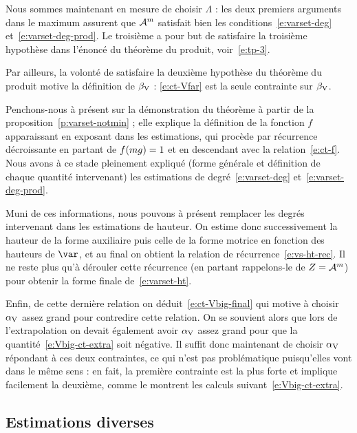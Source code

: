 Nous sommes maintenant en mesure de choisir \( \Lambda \) : les deux premiers
arguments dans le maximum assurent que \( \mathcal A^m \) satisfait bien les
conditions~\eqref{e:varset-deg} et~\eqref{e:varset-deg-prod}. Le troisième a
pour but de satisfaire la troisième hypothèse dans l'énoncé du théorème du
produit, voir~\eqref{e:tp-3}.

Par ailleurs, la volonté de satisfaire la deuxième hypothèse du théorème du
produit motive la définition de \( \beta \sb{\mathrm{V}} \) : \eqref{e:ct-Vfar} est la seule
contrainte sur \( \beta \sb{\mathrm{V}} \).

Penchons-nous à présent sur la démonstration du théorème à partir de la
proposition~\vref{p:varset-notmin} ; elle explique la définition de la fonction
\( f \) apparaissant en exposant dans les estimations, qui procède par
récurrence décroissante en partant de \( f(mg) = 1 \) et en
descendant avec la relation~\eqref{e:ct-f}. Nous avons à ce stade pleinement
expliqué (forme générale et définition de chaque quantité intervenant) les
estimations de degré~\eqref{e:varset-deg} et~\eqref{e:varset-deg-prod}.

Muni de ces informations, nous pouvons à présent remplacer les degrés
intervenant dans les estimations de hauteur. On estime donc successivement la
hauteur de la forme auxiliaire puis celle de la forme motrice en fonction
des hauteurs de \( \var \), et au final on obtient la relation de
récurrence~\eqref{e:vs-ht-rec}. Il ne reste plus qu'à dérouler cette
récurrence (en partant rappelons-le de \( Z = \mathcal A^m \)) pour obtenir la
forme finale de~\eqref{e:varset-ht}.

Enfin, de cette dernière relation on déduit~\eqref{e:ct-Vbig-final} qui
motive à choisir \( \alpha \sb{\mathrm{V}} \) assez grand pour contredire cette relation. On se
souvient alors que lors de l'extrapolation on devait également avoir \( \alpha \sb{\mathrm{V}}
\) assez grand pour que la quantité~\eqref{e:Vbig-ct-extra} soit négative.
Il suffit donc maintenant de choisir \( \alpha \sb{\mathrm{V}} \) répondant à ces deux
contraintes, ce qui n'est pas problématique puisqu'elles vont dans le même
sens : en fait, la première contrainte est la plus forte et implique
facilement la deuxième, comme le montrent les calculs
suivant~\eqref{e:Vbig-ct-extra}.


\subsection{Estimations diverses}

